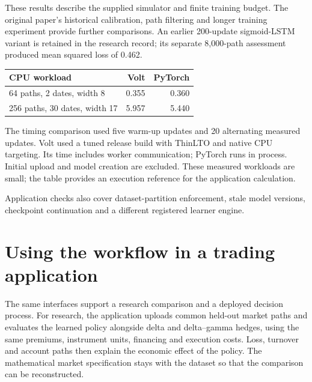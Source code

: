 \documentclass[8pt]{strategynet-journal}
\begin{document}
\begin{SNcolumns}
These results describe the supplied simulator and finite training budget.
The original paper's historical calibration, path filtering and longer
training experiment provide further comparisons. An earlier 200-update
sigmoid-LSTM variant is retained in the research record; its separate
8,000-path assessment produced mean squared loss of 0.462.

\begin{center}
\begin{minipage}{\linewidth}
\centering
\begin{tabular}{@{}p{4.0cm}rr@{}}
\toprule
CPU workload & Volt & PyTorch\\
\midrule
64 paths, 2 dates, width 8 & 0.355 & 0.360\\
256 paths, 30 dates, width 17 & 5.957 & 5.440\\
\bottomrule
\end{tabular}
\end{minipage}
\end{center}

The timing comparison used five warm-up updates and 20 alternating measured
updates. Volt used a tuned release build with ThinLTO and native CPU targeting.
Its time includes worker communication; PyTorch runs in process. Initial
upload and model creation are excluded. These measured workloads are small;
the table provides an execution reference for the application calculation.

Application checks also cover dataset-partition enforcement, stale model
versions, checkpoint continuation and a different registered learner engine.

\section{Using the workflow in a trading application}
The same interfaces support a research comparison and a deployed decision
process. For research, the application uploads common held-out market paths
and evaluates the learned policy alongside delta and delta--gamma hedges,
using the same premiums, instrument units, financing and execution costs.
Loss, turnover and account paths then explain the economic effect of the
policy. The mathematical market specification stays with the dataset so
that the comparison can be reconstructed.


\end{SNcolumns}
\end{document}

